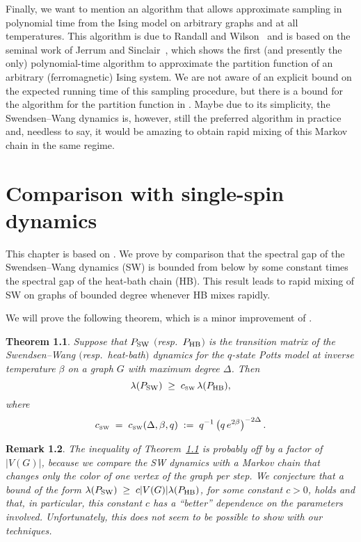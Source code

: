 \documentclass{dis}
\newtheorem{theorem}{Theorem}[chapter]
\newtheorem{remark}[theorem]{Remark}
\theoremstyle{citing}
\begin{document}
Finally, we want to mention an algorithm that allows approximate 
sampling in polynomial time from the Ising model on arbitrary graphs 
and at all temperatures. 
This algorithm is due to Randall and Wilson~\cite{RaWi99} 
and is based on the seminal work of Jerrum and Sinclair~\cite{JS}, 
which shows the first (and presently the only) polynomial-time algorithm 
to approximate the partition function of an arbitrary (ferromagnetic) Ising 
system. We are not aware of an explicit bound on the expected 
running time of this sampling procedure, but
there is a bound for the algorithm for the partition function in \cite{JS}. 
Maybe due to its simplicity, the Swendsen--Wang dynamics is, however, 
still the preferred algorithm in 
practice and, needless to say, it would be amazing to obtain rapid mixing 
of this Markov chain in the same regime.

\chapter{Comparison with single-spin dynamics}\label{chap:spin}

This chapter is based on \cite{U2}. 
We prove by comparison that the spectral gap 
of the Swendsen--Wang dynamics (SW) is bounded from below by 
some constant times the spectral gap of the heat-bath chain (HB). 
This result leads to rapid mixing of SW on graphs of bounded 
degree whenever HB mixes rapidly.

We will prove the following theorem, 
which is a minor improvement of \cite[Thm.~1]{U2}.

\begin{theorem} \label{th:main-spin}
Suppose that ${P_{\rm SW}}$ $($resp.~${P_{\rm HB}}$$)$ is the transition matrix of the 
Swendsen--Wang $($resp.~heat-bath$)$ dynamics for the $q$-state Potts 
model at inverse temperature $\beta$ on a graph $G$ with 
maximum degree ${\Delta}$. 
Then
\[
\lambda({P_{\rm SW}}) \;\ge\; {c_{\text{\rm\tiny SW}}}\,\lambda({P_{\rm HB}}),
\]
where
\begin{equation}\label{eq:csw}
{c_{\text{\rm\tiny SW}}} \;=\; {c_{\text{\rm\tiny SW}}}({\Delta},\beta,q) 
\;:=\; q^{-1}\left(q\,e^{2\beta}\right)^{-2{\Delta}}.
\end{equation}
\vspace{-3mm} 
\end{theorem}

\begin{remark}
The inequality of Theorem~\ref{th:main-spin} is probably 
off by a factor of ${\left\vert {V(G)} \right\vert}$,  
because we compare the SW dynamics with a Markov chain that changes 
only the color of one vertex of the graph per step. 
We conjecture that a bound of the form 
$\lambda({P_{\rm SW}}) \;\ge\; c {\left\vert {V(G)} \right\vert}\lambda({P_{\rm HB}})$, 
for some constant $c>0$, holds and that, in particular, 
this constant $c$ has a ``better'' dependence on the parameters involved. 
Unfortunately, this does not seem to be possible to show with our 
techniques.
\end{remark}
\end{document}
